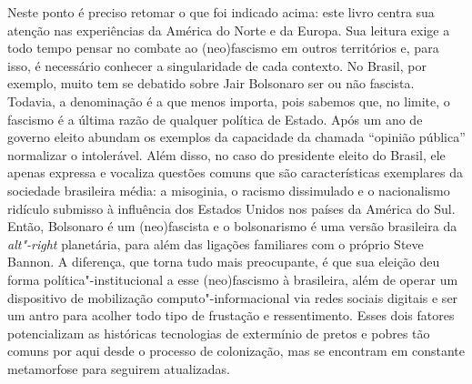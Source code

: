 Neste ponto é preciso retomar o que foi indicado acima: este livro
centra sua atenção nas experiências da América do Norte e da Europa. Sua
leitura exige a todo tempo pensar no combate ao (neo)fascismo em outros
territórios e, para isso, é necessário conhecer a singularidade de cada
contexto. No Brasil, por exemplo, muito tem se debatido sobre Jair
Bolsonaro ser ou não fascista. Todavia, a denominação é a que menos
importa, pois sabemos que, no limite, o fascismo é a última razão de
qualquer política de Estado. Após um ano de governo eleito abundam os
exemplos da capacidade da chamada ``opinião pública'' normalizar o
intolerável. Além disso, no caso do presidente eleito do Brasil, ele
apenas expressa e vocaliza questões comuns que são características
exemplares da sociedade brasileira média: a misoginia, o racismo
dissimulado e o nacionalismo ridículo submisso à influência dos Estados
Unidos nos países da América do Sul. Então, Bolsonaro é um (neo)fascista
e o bolsonarismo é uma versão brasileira da \emph{alt"-right} planetária,
para além das ligações familiares com o próprio Steve Bannon. A
diferença, que torna tudo mais preocupante, é que sua eleição deu forma
política"-institucional a esse (neo)fascismo à brasileira, além de operar
um dispositivo de mobilização computo"-informacional via redes sociais
digitais e ser um antro para acolher todo tipo de frustação e
ressentimento. Esses dois fatores potencializam as históricas
tecnologias de extermínio de pretos e pobres tão comuns por aqui desde o
processo de colonização, mas se encontram em constante metamorfose para
seguirem atualizadas.

